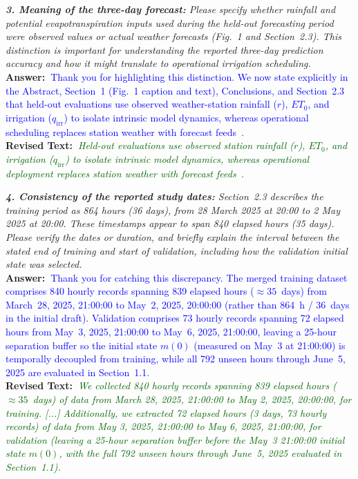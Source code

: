 \documentclass[10pt]{article}
\newcommand{\query}[2][]{\ifthenelse{\equal{#1}{}}{}{\textbf{#1:}~}\emph{#2}}
\newcommand{\ans}[1]{\textbf{Answer:~}#1}
\newcommand{\Rtext}[1]{\textbf{Revised Text:~}#1}
\begin{document}
\query[R-2.3]{\textbf{3. Meaning of the three-day forecast:} Please specify whether rainfall and potential evapotranspiration inputs used during the held-out forecasting period were observed values or actual weather forecasts (Fig.~1 and Section~2.3). This distinction is important for understanding the reported three-day prediction accuracy and how it might translate to operational irrigation scheduling.}\\
\ans{\textcolor{blue}{Thank you for highlighting this distinction. We now state explicitly in the Abstract, Section~1 (Fig.~1 caption and text), Conclusions, and Section~2.3 that held-out evaluations use observed weather-station rainfall ($r$), $ET_0$, and irrigation ($q_{\mathrm{irr}}$) to isolate intrinsic model dynamics, whereas operational scheduling replaces station weather with forecast feeds~\cite{NWS2024}.}}\\
\Rtext{\emph{\textcolor{darkgreen}{Held-out evaluations use observed station rainfall ($r$), $ET_0$, and irrigation ($q_{\mathrm{irr}}$) to isolate intrinsic model dynamics, whereas operational deployment replaces station weather with forecast feeds~\cite{NWS2024}.}}}

\query[R-2.4]{\textbf{4. Consistency of the reported study dates:} Section~2.3 describes the training period as 864 hours (36 days), from 28 March 2025 at 20:00 to 2 May 2025 at 20:00. These timestamps appear to span 840 elapsed hours (35 days). Please verify the dates or duration, and briefly explain the interval between the stated end of training and start of validation, including how the validation initial state was selected.}\\
\ans{\textcolor{blue}{Thank you for catching this discrepancy. The merged training dataset comprises 840 hourly records spanning 839 elapsed hours ($\approx 35$~days) from March~28, 2025, 21:00:00 to May~2, 2025, 20:00:00 (rather than 864~\si{h} / 36~days in the initial draft). Validation comprises 73 hourly records spanning 72 elapsed hours from May~3, 2025, 21:00:00 to May~6, 2025, 21:00:00, leaving a 25-hour separation buffer so the initial state $m(0)$ (measured on May~3 at 21:00:00) is temporally decoupled from training, while all 792 unseen hours through June~5, 2025 are evaluated in Section~1.1.}}\\
\Rtext{\emph{\textcolor{darkgreen}{We collected 840 hourly records spanning 839 elapsed hours ($\approx 35$~days) of data from March 28, 2025, 21:00:00 to May 2, 2025, 20:00:00, for training. [...] Additionally, we extracted 72 elapsed hours (3 days, 73 hourly records) of data from May 3, 2025, 21:00:00 to May 6, 2025, 21:00:00, for validation (leaving a 25-hour separation buffer before the May~3 21:00:00 initial state $m(0)$, with the full 792 unseen hours through June~5, 2025 evaluated in Section~1.1).}}}
\end{document}
